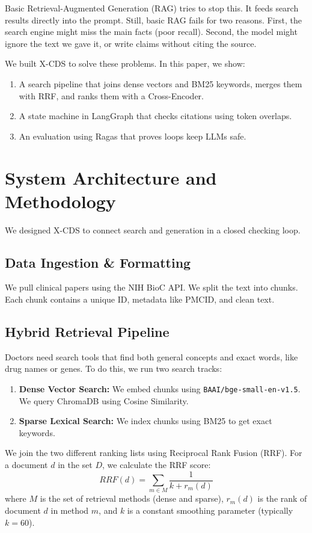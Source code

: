 \documentclass[pdflatex,sn-mathphys-num]{sn-jnl}%
\theoremstyle{thmstyleone}%
\theoremstyle{thmstyletwo}%
\theoremstyle{thmstylethree}%
\begin{document}
Basic Retrieval-Augmented Generation (RAG) tries to stop this. It feeds search results directly into the prompt. Still, basic RAG fails for two reasons. First, the search engine might miss the main facts (poor recall). Second, the model might ignore the text we gave it, or write claims without citing the source.

We built X-CDS to solve these problems. In this paper, we show:
\begin{enumerate}
    \item A search pipeline that joins dense vectors and BM25 keywords, merges them with RRF, and ranks them with a Cross-Encoder.
    \item A state machine in LangGraph that checks citations using token overlaps.
    \item An evaluation using Ragas that proves loops keep LLMs safe.
\end{enumerate}

\section{System Architecture and Methodology}\label{sec:architecture}
We designed X-CDS to connect search and generation in a closed checking loop.

\subsection{Data Ingestion \& Formatting}
We pull clinical papers using the NIH BioC API. We split the text into chunks. Each chunk contains a unique ID, metadata like PMCID, and clean text.

\subsection{Hybrid Retrieval Pipeline}
Doctors need search tools that find both general concepts and exact words, like drug names or genes. To do this, we run two search tracks:
\begin{enumerate}
    \item \textbf{Dense Vector Search:} We embed chunks using \texttt{BAAI/bge-small-en-v1.5}. We query ChromaDB using Cosine Similarity.
    \item \textbf{Sparse Lexical Search:} We index chunks using BM25 to get exact keywords.
\end{enumerate}

We join the two different ranking lists using Reciprocal Rank Fusion (RRF). For a document $d$ in the set $D$, we calculate the RRF score:
\begin{equation}
RRF(d) = \sum_{m \in M} \frac{1}{k + r_m(d)}
\end{equation}
where $M$ is the set of retrieval methods (dense and sparse), $r_m(d)$ is the rank of document $d$ in method $m$, and $k$ is a constant smoothing parameter (typically $k=60$).
\end{document}
